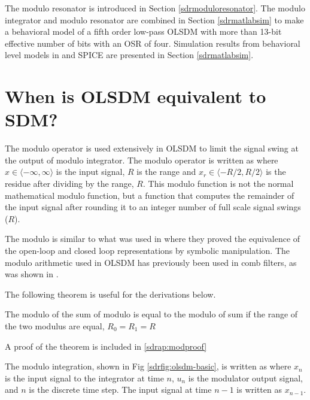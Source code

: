 The modulo resonator is introduced in
Section \ref{sdrmoduloresonator}. The modulo integrator and modulo
resonator are combined in Section \ref{sdrmatlabsim} to make a behavioral
model of a fifth
order low-pass OLSDM with more than 13-bit effective number of bits with an
OSR of four. Simulation results from behavioral level models in \matlab \cite{matlab}
and SPICE are presented in Section \ref{sdrmatlabsim}.


\section{When is OLSDM equivalent to SDM?}\label{sdrbasicmodulo}
The modulo operator is used extensively in OLSDM to limit the signal
swing at the output of modulo integrator. The modulo operator is written as
where $x \in \langle -\infty,\infty \rangle $ is the input signal, $R$ is the range and
$x_r  \in \langle - R/2, R/2 \rangle$ is the residue after dividing by
the range, $R$. 
This
modulo function is not the normal mathematical modulo function, but
a
function that computes the remainder of the input signal after
rounding it to an integer number of full scale signal swings ($R$).

The modulo is similar 
to what was used in \cite{lipshitz07} where they proved the
equivalence of the  open-loop and closed loop representations by
symbolic manipulation. The modulo arithmetic used in OLSDM has  previously been used in
comb filters, as was
shown in \cite{chu84}. 

The following theorem is useful for the derivations below.
\begin{theorem}
The modulo of the sum of modulo is equal to the modulo of sum if the range of the
two modulus are equal, $R_0 = R_1=R$
\end{theorem}
A proof of the theorem is included in \myappname \ref{sdrap:modproof}

The modulo integration, shown in Fig \ref{sdrfig:olsdm-basic}, is
written as
where $x_n$ is the input signal to the integrator at time $n$, $u_n$ is the
modulator output signal, and $n$ is the discrete time step. The input signal at
time $n-1$ is written as $x_{n-1}$.

